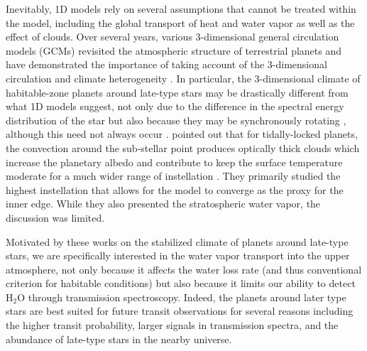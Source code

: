 \documentclass[11pt,numberedappendix,twocolappendix,]{emulateapj}
\def\water{H$_2$O }
\begin{document}
Inevitably, 1D models rely on several assumptions that cannot be treated within the model, including the global transport of heat and water vapor as well as the effect of clouds. 
Over several years, various 3-dimensional general circulation models (GCMs) revisited the atmospheric structure of terrestrial planets and have demonstrated the importance of taking account of the 3-dimensional circulation and climate heterogeneity \citep[e.g.,][]{Ishiwatari2002,Abe2011,Leconte2013a,Leconte2013b,Wolf2014,Wolf2015}. 
In particular, the 3-dimensional climate of habitable-zone planets around late-type stars may be drastically different from what 1D models suggest, not only due to the difference in the spectral energy distribution of the star but also because they may be synchronously rotating \citep{Dole1964, Kasting1993}, although this need not always occur \citep{Goldreich1966,Leconte2015}.  
%
\citet{Yang2013} pointed out that for tidally-locked planets, the convection around the sub-stellar point produces optically thick clouds which increase the planetary albedo and contribute to keep the surface temperature moderate for a much wider range of instellation \citep[see also][]{Yang2014,Way2015,Kopparapu2016}. 
They primarily studied the highest instellation that allows for the model to converge as the proxy for the inner edge. 
While they also presented the stratospheric water vapor, the discussion was limited. 

Motivated by these works on the stabilized climate of planets around late-type stars, we are specifically interested in the water vapor transport  into the upper atmosphere, not only because it affects the water loss rate (and thus conventional criterion for habitable conditions) but also because it limits our ability to detect \water through transmission spectroscopy. 
%
Indeed, the planets around later type stars are best suited for future transit observations for several reasons including the higher transit probability, larger signals in transmission spectra, and the abundance of late-type stars in the nearby universe. 
\end{document}
